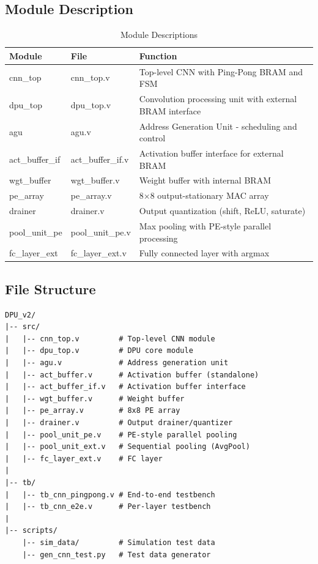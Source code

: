 \documentclass[11pt,a4paper]{article}
\begin{document}
\subsection{Module Description}

\begin{table}[H]
\centering
\caption{Module Descriptions}
\begin{tabular}{llp{7cm}}
\toprule
\textbf{Module} & \textbf{File} & \textbf{Function} \\
\midrule
cnn\_top & cnn\_top.v & Top-level CNN with Ping-Pong BRAM and FSM \\
dpu\_top & dpu\_top.v & Convolution processing unit with external BRAM interface \\
agu & agu.v & Address Generation Unit - scheduling and control \\
act\_buffer\_if & act\_buffer\_if.v & Activation buffer interface for external BRAM \\
wgt\_buffer & wgt\_buffer.v & Weight buffer with internal BRAM \\
pe\_array & pe\_array.v & 8×8 output-stationary MAC array \\
drainer & drainer.v & Output quantization (shift, ReLU, saturate) \\
pool\_unit\_pe & pool\_unit\_pe.v & Max pooling with PE-style parallel processing \\
fc\_layer\_ext & fc\_layer\_ext.v & Fully connected layer with argmax \\
\bottomrule
\end{tabular}
\end{table}

\subsection{File Structure}
\begin{lstlisting}[caption=Project Directory Structure]
DPU_v2/
|-- src/
|   |-- cnn_top.v         # Top-level CNN module
|   |-- dpu_top.v         # DPU core module
|   |-- agu.v             # Address generation unit
|   |-- act_buffer.v      # Activation buffer (standalone)
|   |-- act_buffer_if.v   # Activation buffer interface
|   |-- wgt_buffer.v      # Weight buffer
|   |-- pe_array.v        # 8x8 PE array
|   |-- drainer.v         # Output drainer/quantizer
|   |-- pool_unit_pe.v    # PE-style parallel pooling
|   |-- pool_unit_ext.v   # Sequential pooling (AvgPool)
|   |-- fc_layer_ext.v    # FC layer
|
|-- tb/
|   |-- tb_cnn_pingpong.v # End-to-end testbench
|   |-- tb_cnn_e2e.v      # Per-layer testbench
|
|-- scripts/
    |-- sim_data/         # Simulation test data
    |-- gen_cnn_test.py   # Test data generator
\end{lstlisting}
\end{document}
